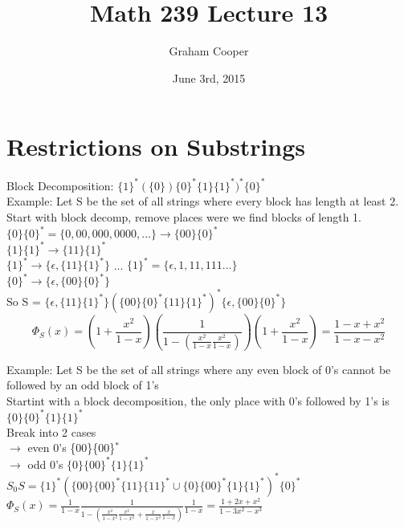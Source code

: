 \documentclass[12pt]{article}
\title{\vspace{-15ex}Math 239 Lecture 13\vspace{-1ex}}
\date{June 3rd, 2015}
\author{Graham Cooper}
\begin{document}
	\maketitle
	
	\section*{Restrictions on Substrings}
	
	Block Decomposition: $\{1\}^*(\{0\})\{0\}^*\{1\}\{1\}^*)^*\{0\}^*$\\
	
	Example: Let S be the set of all strings where every block has length at least 2.\\
	
	Start with block decomp, remove places were we find blocks of length 1.\\
	
	$\{0\}\{0\}^* = \{0, 00, 000, 0000, ...\} \rightarrow \{00\}\{0\}^*$\\
	$\{1\}\{1\}^* \rightarrow \{11\}\{1\}^*$\\
	$\{1\}^* \rightarrow \{\epsilon, \{11\}\{1\}^*\}$ ... $ \{1\}^* = \{\epsilon, 1, 11, 111 ... \}$\\
	$\{0\}^* \rightarrow \{ \epsilon, \{00\}\{0\}^* \}$\\
	
	So S = $\{\epsilon, \{11\}\{1\}^* \}(\{00\}\{0\}^*\{11\}\{1\}^*)^*\{\epsilon, \{00\}\{0\}^* \}$\\
	$$\Phi_S(x) = (1 + \frac{x^2}{1-x})(\frac{1}{1 - (\frac{x^2}{1-x} \frac{x^2}{1-x})})(1 + \frac{x^2}{1-x}) = \frac{1-x+x^2}{1-x-x^2}$$
	
	Example: Let S be the set of all strings where any even block of 0's cannot be followed by an odd block of 1's\\
	
	Startint with a block decomposition, the only place with 0's followed by 1's is $\{0\}\{0\}^*\{1\}\{1\}^*$\\
	
	Break into 2 cases \\
	$\rightarrow$ even 0's \{00\}\{00\}$^*$\\
	$\rightarrow$ odd 0's $\{0\}\{00\}^*\{1\}\{1\}^*$\\
	
	$S_0 S = \{1\}^*(\{00\}\{00\}^*\{11\}\{11\}^* \cup \{0\}\{00\}^*\{1\}\{1\}^*)^*\{0\}^*$\\
	
	$\Phi_S(x) = \frac{1}{1-x}\frac{1}{1 - (\frac{x^2}{1-x^2}\frac{x^2}{1-x^2} + \frac{x}{1-x^2}\frac{x}{1-x})}\frac{1}{1-x} = \frac{1+2x+x^2}{1-3x^2 - x^3}$\\
\end{document}
